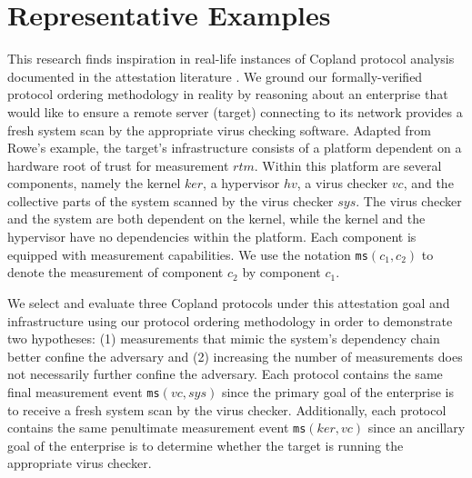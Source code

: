 \documentclass[runningheads]{llncs}
\theoremstyle{definition}
\begin{document}
\section{Representative Examples}

This research finds inspiration in real-life instances of Copland protocol analysis documented in the attestation literature \cite{Rowe:2021:OnOrdering,Coker::Principles-of-R}. We ground our formally-verified protocol ordering methodology in reality by reasoning about an enterprise that would like to ensure a remote server (target) connecting to its network provides a fresh system scan by the appropriate virus checking software. Adapted from Rowe's \cite{Rowe:2016:Confining} example, the target's infrastructure consists of a platform dependent on a hardware root of trust for measurement $rtm$. Within this platform are several components, namely the kernel $ker$, a hypervisor $hv$, a virus checker $vc$, and the collective parts of the system scanned by the virus checker $sys$. The virus checker and the system are both dependent on the kernel, while the kernel and the hypervisor have no dependencies within the platform. Each component is equipped with measurement capabilities. We use the notation \texttt{ms}$(c_1,c_2)$ to denote the measurement of component $c_2$ by component $c_1$.

We select and evaluate three Copland protocols under this attestation goal and infrastructure using our protocol ordering methodology in order to demonstrate two hypotheses: (1) measurements that mimic the system's dependency chain better confine the adversary and (2) increasing the number of measurements does not necessarily further confine the adversary. Each protocol contains the same final measurement event \texttt{ms}$(vc,sys)$ since the primary goal of the enterprise is to receive a fresh system scan by the virus checker. Additionally, each protocol contains the same penultimate measurement event \texttt{ms}$(ker,vc)$ since an ancillary goal of the enterprise is to determine whether the target is running the appropriate virus checker.
\end{document}
